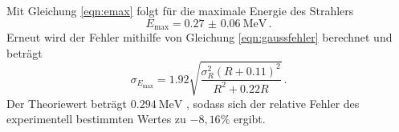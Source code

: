 Mit Gleichung \eqref{eqn:emax} folgt für die maximale Energie des Strahlers
\begin{equation*}
  E_\text{max} = \SI{0.27(6)}{\mega\electronvolt}\,.
\end{equation*}
Erneut wird der Fehler mithilfe von Gleichung \eqref{eqn:gaussfehler} berechnet und beträgt
\begin{equation*}
  \sigma_{E_\text{max}} = 1.92 \sqrt{\frac{\sigma_{R}^{2} \left(R + 0.11\right)^{2}}{R^{2} + 0.22 R}} \,.
\end{equation*}
Der Theoriewert beträgt $\SI{0.294}{\mega\electronvolt}$ \cite{energy}, sodass sich der relative
Fehler des experimentell bestimmten Wertes zu $-8{,}16\%$ ergibt.
